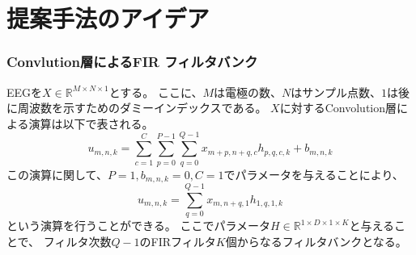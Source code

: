 


\section{\mc 提案手法のアイデア}
\subsubsection{\rm Convlution\mc 層によるFIR フィルタバンク}
EEGを\(X\in \mathbb R^{M\times N\times 1}\)とする。
ここに、\(M\)は電極の数、\(N\)はサンプル点数、\(1\)は後に周波数を示すためのダミーインデックスである。
\(X\)に対するConvolution層による演算は以下で表される。
\begin{equation}
    u_{m,n,k} = \sum_{c=1}^C\sum_{p=0}^{P-1}\sum_{q=0}^{Q-1} x_{m+p,n+q,c} h_{p,q,c,k} + b_{m,n,k}
\end{equation} 
この演算に関して、\(P=1,b_{m,n,k}=0,C=1\)でパラメータを与えることにより、
\begin{equation}
    u_{m,n,k} = \sum_{q=0}^{Q-1} x_{m,n+q,1} h_{1,q,1,k}
    \label{eq:pseudoFIR}
\end{equation} 
という演算を行うことができる。
ここでパラメータ\(H\in \mathbb R^{1\times D\times 1\times K}\)と与えることで、
フィルタ次数\(Q-1\)のFIRフィルタ\(K\)個からなるフィルタバンクとなる。

